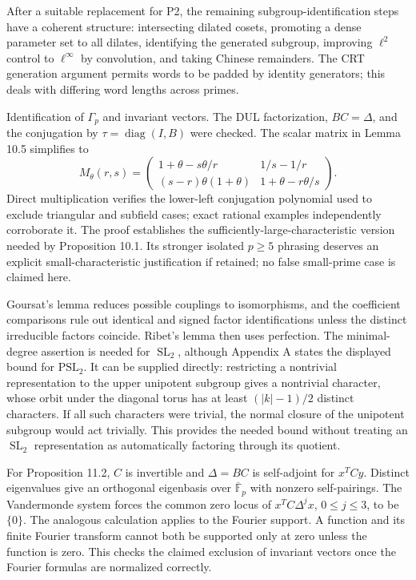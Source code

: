 \documentclass[10pt]{article}
\begin{document}
After a suitable replacement for P2, the remaining subgroup-identification steps have a coherent structure: intersecting dilated cosets, promoting a dense parameter set to all dilates, identifying the generated subgroup, improving \(\ell^2\) control to \(\ell^\infty\) by convolution, and taking Chinese remainders. The CRT generation argument permits words to be padded by identity generators; this deals with differing word lengths across primes.\par
Identification of \(\Gamma_p\) and invariant vectors. The DUL factorization, \(BC=\Delta\), and the conjugation by \(\tau=\operatorname{diag}(I,B)\) were checked. The scalar matrix in Lemma 10.5 simplifies to \[M_\theta(r,s)=
 \begin{pmatrix}
 1+\theta-s\theta/r&1/s-1/r\\
 (s-r)\theta(1+\theta)&1+\theta-r\theta/s
 \end{pmatrix}.\] Direct multiplication verifies the lower-left conjugation polynomial used to exclude triangular and subfield cases; exact rational examples independently corroborate it. The proof establishes the sufficiently-large-characteristic version needed by Proposition 10.1. Its stronger isolated \(p\ge5\) phrasing deserves an explicit small-characteristic justification if retained; no false small-prime case is claimed here.\par
Goursat’s lemma reduces possible couplings to isomorphisms, and the coefficient comparisons rule out identical and signed factor identifications unless the distinct irreducible factors coincide. Ribet’s lemma then uses perfection. The minimal-degree assertion is needed for \(\operatorname{SL}_2\), although Appendix A states the displayed bound for \(\mathrm{PSL}_2\). It can be supplied directly: restricting a nontrivial representation to the upper unipotent subgroup gives a nontrivial character, whose orbit under the diagonal torus has at least \((|k|-1)/2\) distinct characters. If all such characters were trivial, the normal closure of the unipotent subgroup would act trivially. This provides the needed bound without treating an \(\operatorname{SL}_2\) representation as automatically factoring through its quotient.\par
For Proposition 11.2, \(C\) is invertible and \(\Delta=BC\) is self-adjoint for \(x^TCy\). Distinct eigenvalues give an orthogonal eigenbasis over \(\overline{\mathbb F}_p\) with nonzero self-pairings. The Vandermonde system forces the common zero locus of \(x^TC\Delta^j x\), \(0\le j\le3\), to be \(\{0\}\). The analogous calculation applies to the Fourier support. A function and its finite Fourier transform cannot both be supported only at zero unless the function is zero. This checks the claimed exclusion of invariant vectors once the Fourier formulas are normalized correctly.\par
\end{document}
